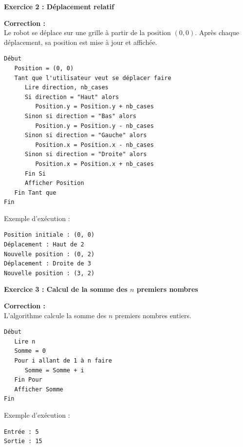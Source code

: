 \documentclass{article}
\begin{document}
\begin{tcolorbox}[colback=green!10!white, colframe=green!75!black, title=\textcolor{white}{  Corrections}]

\textbf{Exercice 2 : Déplacement relatif}

\textbf{Correction :} \\
Le robot se déplace sur une grille à partir de la position \( (0, 0) \). Après chaque déplacement, sa position est mise à jour et affichée.

\begin{verbatim}
Début
   Position = (0, 0)
   Tant que l'utilisateur veut se déplacer faire
      Lire direction, nb_cases
      Si direction = "Haut" alors
         Position.y = Position.y + nb_cases
      Sinon si direction = "Bas" alors
         Position.y = Position.y - nb_cases
      Sinon si direction = "Gauche" alors
         Position.x = Position.x - nb_cases
      Sinon si direction = "Droite" alors
         Position.x = Position.x + nb_cases
      Fin Si
      Afficher Position
   Fin Tant que
Fin
\end{verbatim}

Exemple d'exécution :
\begin{verbatim}
Position initiale : (0, 0)
Déplacement : Haut de 2
Nouvelle position : (0, 2)
Déplacement : Droite de 3
Nouvelle position : (3, 2)
\end{verbatim}

\vspace{0.5cm}

\textbf{Exercice 3 : Calcul de la somme des \( n \) premiers nombres}

\textbf{Correction :} \\
L'algorithme calcule la somme des \( n \) premiers nombres entiers.

\begin{verbatim}
Début
   Lire n
   Somme = 0
   Pour i allant de 1 à n faire
      Somme = Somme + i
   Fin Pour
   Afficher Somme
Fin
\end{verbatim}

Exemple d'exécution :
\begin{verbatim}
Entrée : 5
Sortie : 15
\end{verbatim}

\end{tcolorbox}
\end{document}
